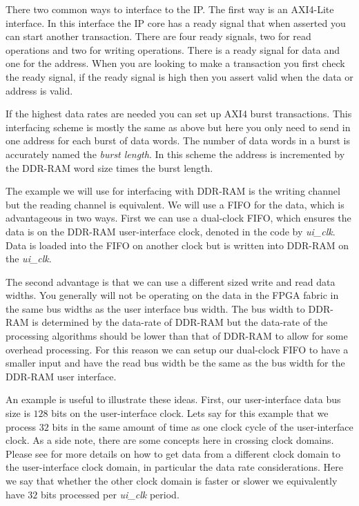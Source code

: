 There two common ways to interface to the \ac{IP}. The first way is an \ac{AXI4}-Lite interface. In this interface the \ac{IP} core has a ready signal that when asserted you can start another transaction. There are four ready signals, two for read operations and two for writing operations. There is a ready signal for data and one for the address. When you are looking to make a transaction you first check the ready signal, if the ready signal is high then you assert valid when the data or address is valid. 

If the highest data rates are needed you can set up \ac{AXI4} burst transactions. This interfacing scheme is mostly the same as above but here you only need to send in one address for each burst of data words. The number of data words in a burst is accurately named the \emph{burst length}. In this scheme the address is incremented by the \ac{DDR}-\ac{RAM} word size times the burst length.  

The example we will use for interfacing with \ac{DDR}-\ac{RAM} is the writing channel but the reading channel is equivalent. We will use a \ac{FIFO} for the data, which is advantageous in two ways. First we can use a dual-clock \ac{FIFO}, which ensures the data is on the \ac{DDR}-\ac{RAM} user-interface clock, denoted in the code by \emph{ui\_clk}. Data is loaded into the \ac{FIFO} on another clock but is written into \ac{DDR}-\ac{RAM} on the \emph{ui\_clk}. 

The second advantage is that we can use a different sized write and read data widths. You generally will not be operating on the data in the \ac{FPGA} fabric in the same bus widths as the user interface bus width. The bus width to \ac{DDR}-\ac{RAM} is determined by the data-rate of \ac{DDR}-\ac{RAM} but the data-rate of the processing algorithms should be lower than that of \ac{DDR}-\ac{RAM} to allow for some overhead processing. For this reason we can setup our dual-clock \ac{FIFO} to have a smaller input and have the read bus width be the same as the bus width for the \ac{DDR}-\ac{RAM} user interface. 

An example is useful to illustrate these ideas. First, our user-interface data bus size is $128$ bits on the user-interface clock. Lets say for this example that we process $32$ bits in the same amount of time as one clock cycle of the user-interface clock. As a side note, there are some concepts here in crossing clock domains. Please see  for more details on how to get data from a different clock domain to the user-interface clock domain, in particular the data rate considerations. Here we say that whether the other clock domain is faster or slower we equivalently have $32$ bits processed per \emph{ui\_clk} period.  

